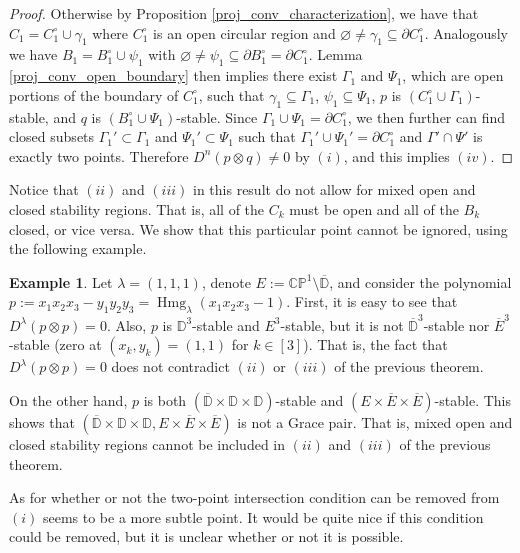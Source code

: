 \documentclass{article}
\theoremstyle{definition}
\newtheorem{example}[theorem]{Example}
\theoremstyle{plain}
\newcommand{\CP}{\mathbb{CP}}
\newcommand{\D}{\mathbb{D}}
\DeclareMathOperator{\Hmg}{Hmg}
\begin{document}
\begin{proof}
    Otherwise by Proposition \ref{proj_conv_characterization}, we have that $C_1 = C_1^\circ \cup \gamma_1$ where $C_1^\circ$ is an open circular region and $\varnothing \neq \gamma_1 \subseteq \partial C_1^\circ$. Analogously we have $B_1 = B_1^\circ \cup \psi_1$ with $\varnothing \neq \psi_1 \subseteq \partial B_1^\circ = \partial C_1^\circ$. Lemma \ref{proj_conv_open_boundary} then implies there exist $\Gamma_1$ and $\Psi_1$, which are open portions of the boundary of $C_1^\circ$, such that $\gamma_1 \subseteq \Gamma_1$, $\psi_1 \subseteq \Psi_1$, $p$ is $(C_1^\circ \cup \Gamma_1)$-stable, and $q$ is $(B_1^\circ \cup \Psi_1)$-stable. Since $\Gamma_1 \cup \Psi_1 = \partial C_1^\circ$, we then further can find closed subsets $\Gamma_1' \subset \Gamma_1$ and $\Psi_1' \subset \Psi_1$ such that $\Gamma_1' \cup \Psi_1' = \partial C_1^\circ$ and $\Gamma' \cap \Psi'$ is exactly two points. Therefore $D^n(p \otimes q) \neq 0$ by $(i)$, and this implies $(iv)$.
\end{proof}

Notice that $(ii)$ and $(iii)$ in this result do not allow for mixed open and closed stability regions. That is, all of the $C_k$ must be open and all of the $B_k$ closed, or vice versa. We show that this particular point cannot be ignored, using the following example.

\begin{example}
    Let $\lambda = (1,1,1)$, denote $E := \CP^1 \setminus \overline{\D}$, and consider the polynomial $p := x_1x_2x_3 - y_1y_2y_3 = \Hmg_\lambda(x_1x_2x_3 - 1)$. First, it is easy to see that $D^\lambda(p \otimes p) = 0$. Also, $p$ is $\D^3$-stable and $E^3$-stable, but it is not $\overline{\D}^3$-stable nor $\overline{E}^3$-stable (zero at $(x_k,y_k) = (1,1)$ for $k \in [3]$). That is, the fact that $D^\lambda(p \otimes p) = 0$ does not contradict $(ii)$ or $(iii)$ of the previous theorem.
    
    On the other hand, $p$ is both $(\overline{\D} \times \D \times \D)$-stable and $(E \times \overline{E} \times \overline{E})$-stable. This shows that $(\overline{\D} \times \D \times \D, E \times \overline{E} \times \overline{E})$ is not a Grace pair. That is, mixed open and closed stability regions cannot be included in $(ii)$ and $(iii)$ of the previous theorem.
\end{example}

As for whether or not the two-point intersection condition can be removed from $(i)$ seems to be a more subtle point. It would be quite nice if this condition could be removed, but it is unclear whether or not it is possible.
\end{document}

